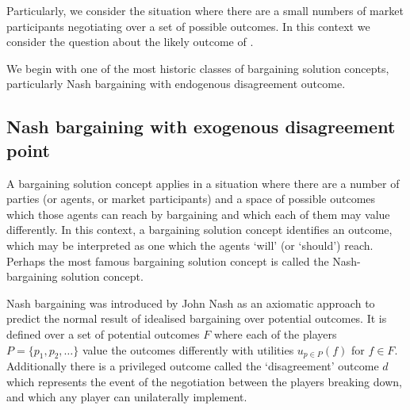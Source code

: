 Particularly, we consider the situation where there are a small numbers of market participants negotiating over a set of possible outcomes.
In this context \DIFdelbegin \DIFdel{, }\DIFdelend we consider the question about \DIFaddbegin {}\DIFaddend the likely outcome of \DIFdelbegin {}\DIFdelend \DIFaddbegin {}\DIFaddend .


We begin with one of the most historic classes of bargaining solution concepts, particularly Nash bargaining with endogenous disagreement outcome.

\subsection{Nash bargaining with exogenous disagreement point}\label{sec:nash_bargaining_exogenous}




A bargaining solution concept applies in a situation where there are a number of parties (or agents, or market participants) and a space of possible outcomes which those agents can reach by bargaining \DIFdelbegin \DIFdel{; }\DIFdelend and which each of them may value differently.
In this context, a bargaining solution concept identifies an outcome, which may be interpreted as one which the agents `will' (or `should') reach.
Perhaps the most famous bargaining solution concept is called the Nash-bargaining solution concept.

Nash bargaining was introduced by John Nash \citep{nash1} as an axiomatic approach to predict the normal result of idealised bargaining over potential outcomes.
It is defined over a set of potential outcomes $F$ %
where each of the players $P=\{p_1,p_2,\dots\}$ value the outcomes differently with utilities $u_{p\in P}(f)$ for $f\in F$.
Additionally there is a privileged outcome called the `disagreement' outcome $d$ which represents the event of the negotiation between the players breaking down, and which any player can unilaterally implement.

